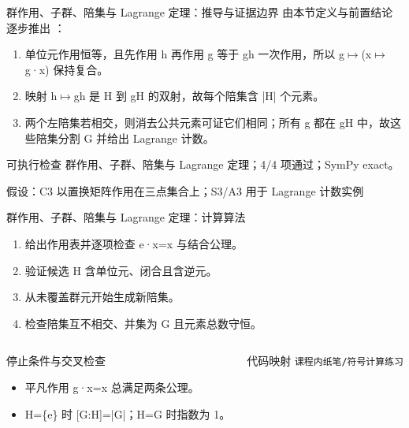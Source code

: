 \begin{frame}[t]{群作用、子群、陪集与 Lagrange 定理：推导与证据边界}
\footnotesize
{}\quad 由本节定义与前置结论逐步推出 ：
\begin{enumerate}
\item 单位元作用恒等，且先作用 h 再作用 g 等于 gh 一次作用，所以 g\ensuremath{\mapsto}(x\ensuremath{\mapsto}g·x) 保持复合。
\item 映射 h\ensuremath{\mapsto}gh 是 H 到 gH 的双射，故每个陪集含 |H| 个元素。
\item 两个左陪集若相交，则消去公共元素可证它们相同；所有 g 都在 gH 中，故这些陪集分割 G 并给出 Lagrange 计数。
\end{enumerate}\begin{block}{可执行检查}
\quad 群作用、子群、陪集与 Lagrange 定理；4/4 项通过；SymPy exact。
\par\scriptsize 假设：C3 以置换矩阵作用在三点集合上；S3/\allowbreak{}A3 用于 Lagrange 计数实例
\end{block}
\end{frame}

\begin{frame}[t]{群作用、子群、陪集与 Lagrange 定理：计算算法}
\footnotesize
{}\begin{enumerate}
\item 给出作用表并逐项检查 e·x=x 与结合公理。
\item 验证候选 H 含单位元、闭合且含逆元。
\item 从未覆盖群元开始生成新陪集。
\item 检查陪集互不相交、并集为 G 且元素总数守恒。
\end{enumerate}\begin{columns}[T,onlytextwidth]
\begin{block}{停止条件与交叉检查}\scriptsize\begin{itemize}
\item[\CheckMark] 平凡作用 g·x=x 总满足两条公理。
\item[\CheckMark] H=\{e\} 时 [G:H]=|G|；H=G 时指数为 1。
\end{itemize}\end{block}
\begin{block}{代码映射}
\scriptsize \texttt{课程内纸笔/\allowbreak{}符号计算练习}
\end{block}\end{columns}\end{frame}

